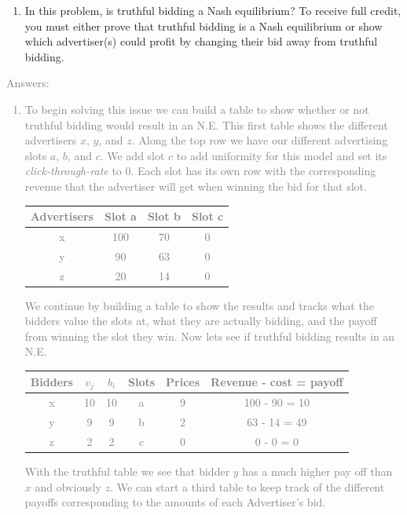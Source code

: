 \documentclass[11pt]{article}
\begin{document}
\begin{enumerate}
	 \item In this problem, is truthful bidding a Nash equilibrium? To receive full credit, you must either prove that truthful bidding is a Nash equilibrium or show which advertiser(s) could profit by changing their bid away from truthful bidding.
\end{enumerate}
\textcolor{gray}{
Answers:
\begin{enumerate}
	\item To begin solving this issue we can build a table to show whether or not truthful bidding would result in an N.E. This first table shows the different advertisers $x$, $y$,  and $z$.  Along the top row we have our different advertising slots $a$, $b$, and $c$. We add slot $c$ to add uniformity for this model and set its \textit{click-through-rate} to 0. Each slot has its own row with the corresponding revenue that the advertiser will get when winning the bid for that slot.  \\
	\begin{center}
		\begin{tabular}{ |c|c|c|c| } 
			\hline
			Advertisers & Slot a & Slot b & Slot c\\
			\hline \hline
			x & 100 & 70 & 0 \\
			\hline
			y & 90 & 63 & 0 \\
			\hline
			z & 20 & 14 & 0 \\ 
			\hline
		\end{tabular}
	\end{center}
We continue by building a table to show the results and tracks what the bidders value the slots at, what they are actually bidding, and the payoff from winning the slot they win. Now lets see if truthful bidding results in an N.E.
	\begin{center}
		\begin{tabular}{ |c|c|c|c|c|c| } 
			\hline
			Bidders & 	$v_j$ 	& 	$b_i$ 	& 	Slots 	& 	Prices 	&  Revenue - cost = payoff \\
			\hline \hline
			x 	  & 	10 	& 	10 	& 	a 	& 	9 	&  100 - 90 = 10\\
			\hline
			y 	  & 	9 	& 	9 	& 	b 	& 	2 	&  63 - 14 = 49 \\
			\hline
			z 	  & 	2 	& 	2 	& 	c	& 	0 	&  0 - 0 = 0 \\
			\hline
		\end{tabular}
	\end{center}
With the truthful table we see that bidder $y$ has a much higher pay off than $x$ and obviously $z$.  We can start a third table to keep track of the different payoffs corresponding to the amounts of each Advertiser's bid.

\end{enumerate}}
\end{document}
